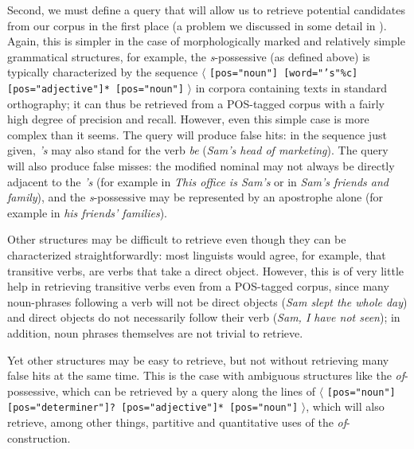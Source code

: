 Second, we must define a query  that will allow us to retrieve  potential candidates from our corpus in the first place (a problem we discussed in some detail in ). Again, this is simpler in the case of morphologically  marked  and relatively simple grammatical  structures, for example, the \textit{s}-possessive  (as defined above) is typically characterized by the sequence $\langle$ \texttt{[pos="noun"] [word="'s"\%c] [pos="adjective"]* [pos="noun"]} $\rangle$ in corpora containing texts in standard orthography; it can thus be retrieved from a POS\hyp{}tagged  corpus with a fairly high degree of precision  and recall.  However, even this simple case is more complex than it seems. The query  will produce false hits:  in the sequence just given, \textit{'s} may also stand for the verb  \textit{be} (\textit{Sam's head of marketing}). The query will also produce false misses: the modified nominal  may not always be directly adjacent to the \textit{'s} (for example in \textit{This office is Sam's} or in \textit{Sam's friends and family}), and the \textit{s}-possessive  may be represented by an apostrophe alone (for example in \textit{his friends' families}).

Other structures may be difficult to retrieve  even though they can be characterized straightforwardly: most linguists would agree, for example, that transitive  verbs,  are verbs that take a direct object. However, this is of very little help in retrieving transitive verbs even from a POS\hyp{}tagged  corpus, since many noun\hyp{}phrases  following a verb will not be direct objects (\textit{Sam slept the whole day}) and direct objects do not necessarily follow their verb  (\textit{Sam, I have not seen}); in addition, noun phrases themselves are not trivial to retrieve.

Yet other structures may be easy to retrieve,  but not without retrieving many false hits  at the same time. This is the case with ambiguous  structures like the \textit{of}-possessive,  which can be retrieved by a query  along the lines of $\langle$ \texttt{[pos="noun"] [pos="determiner"]? [pos="adjective"]* [pos="noun"]} $\rangle$, which will also retrieve, among other things, partitive and quantitative uses of the \textit{of}\hyp{}construction.

